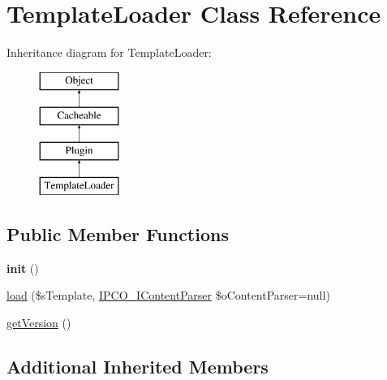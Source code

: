\hypertarget{class_template_loader}{\section{Template\-Loader Class Reference}
\label{class_template_loader}
}
Inheritance diagram for Template\-Loader\-:\begin{figure}[H]
\begin{center}
\leavevmode
\includegraphics[height=4.000000cm]{class_template_loader}
\end{center}
\end{figure}
\subsection*{Public Member Functions}
\begin{DoxyCompactItemize}
\item 
\hypertarget{class_template_loader_a86fac604e3fa8d978658be524b06d3fc}{{\bfseries init} ()}\label{class_template_loader_a86fac604e3fa8d978658be524b06d3fc}

\item 
\hyperlink{class_template_loader_afa19ff3c565fb6afe36262971421ae12}{load} (\$s\-Template, \hyperlink{interface_i_p_c_o___i_content_parser}{I\-P\-C\-O\-\_\-\-I\-Content\-Parser} \$o\-Content\-Parser=null)
\item 
\hyperlink{class_template_loader_addcf3877964626b7166e2bb9f538bac6}{get\-Version} ()
\end{DoxyCompactItemize}
\subsection*{Additional Inherited Members}


